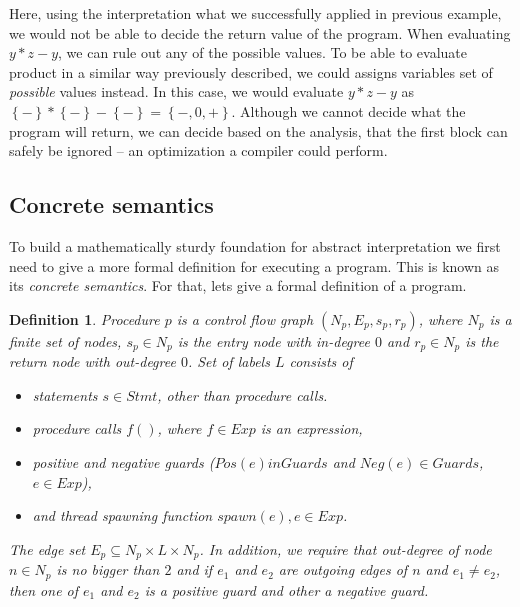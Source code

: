 \documentclass[..thesis.tex]{subfiles}
\newtheorem{defin}{Definition}[section]
\begin{document}
Here, using the interpretation what we successfully applied in previous example, we would not be able to decide the return value of the program. 
When evaluating $y * z - y $, we can rule out any of the possible values. To be able to evaluate product in a similar way previously described,
we could assigns variables set of \textit{possible} values instead. In this case, we would evaluate $y * z - y $ as $\left\lbrace - \right\rbrace * \left\lbrace
- \right\rbrace - \left\lbrace - \right\rbrace = \left\lbrace -,0,+ \right\rbrace$. Although we cannot decide what the program will return,
we can decide based on the analysis, that the first  block can safely be ignored -- an optimization a compiler could perform.

\subsection{Concrete semantics}

To build a mathematically sturdy foundation for abstract interpretation we first need to give a more formal definition for executing a program.
This is known as its \emph{concrete semantics}.
 For that, lets give a formal definition of a program.

\begin{defin}
Procedure $p$ is a \textit{control flow graph} $\left( N_p,E_p,s_p,r_p \right)$, where $N_p$ is a finite set of nodes, $s_p \in N_p$
is the \textit{entry} node with in-degree $0$ and  $r_p \in N_p$ is the \textit{return} node with out-degree $0$. Set of labels $L$ consists of
\begin{itemize}
\item statements $s \in Stmt$, other than procedure calls.
\item procedure calls $f()$, where $f \in Exp$ is an expression, 
\item positive and negative guards ($Pos\left( e \right) in Guards$ and $Neg \left( e \right) \in Guards$, $e \in Exp$),
\item and thread spawning function $spawn\left( e \right), e \in Exp$.  
\end{itemize}
The edge set  $E_p \subseteq N_p \times L \times N_p$. In addition, we require that out-degree of node $n \in N_p$ is no bigger than $2$ 
and if $e_1$ and $e_2$ are outgoing edges of $n$ and $e_1 \neq e_2$, then one of $e_1$ and $e_2$ is a positive guard and other a negative guard. 
\end{defin}
\end{document}
